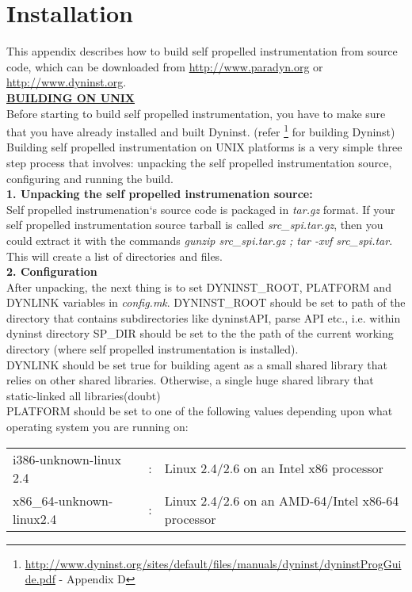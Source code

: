 \section{Installation}
This appendix describes how to build self propelled instrumentation from source code, which can be downloaded from \url{http://www.paradyn.org} or \url{http://www.dyninst.org}. \\

\underline{\textbf{BUILDING ON UNIX}}	\\
Before starting to build self propelled instrumentation, you have to make sure that you have already installed and built Dyninst. (refer \footnote{\url{http://www.dyninst.org/sites/default/files/manuals/dyninst/dyninstProgGuide.pdf} - Appendix D} for building Dyninst) \\

Building self propelled instrumentation on UNIX platforms is a very simple three step process that involves: unpacking the self propelled instrumentation source, configuring and running the build. \\

\textbf{1. Unpacking the self propelled instrumenation source:} \\
Self propelled instrumenation`s source code is packaged in \textit{tar.gz} format. If your self propelled instrumentation source tarball is called \textit{src\_spi.tar.gz}, then you could extract it with the commands \textit{gunzip src\_spi.tar.gz ; tar  -xvf src\_spi.tar}. This will create a list of directories and files.  \\

\textbf{2. Configuration} \\
After unpacking, the next thing is to set DYNINST\_ROOT, PLATFORM and DYNLINK variables in \textit{config.mk}.  DYNINST\_ROOT should be set to path of the directory that contains subdirectories like dyninstAPI, parse API etc.,  i.e. within dyninst directory SP\_DIR should be set to the the path of the current working directory (where self propelled instrumentation is installed). \\
DYNLINK should be set true for building agent as a small shared library that relies on other shared libraries. Otherwise, a single huge shared library that static-linked all libraries(doubt) \\
PLATFORM should be set to one of the following values depending upon what operating system you are running on: \\
\begin{table}[h]
\begin{tabular}{l c l}
 i386-unknown-linux 2.4  & : & Linux 2.4/2.6 on an Intel x86 processor \\
 x86\_64-unknown-linux2.4&: &Linux 2.4/2.6 on an AMD-64/Intel x86-64  processor \\
\end{tabular}
\end{table}

